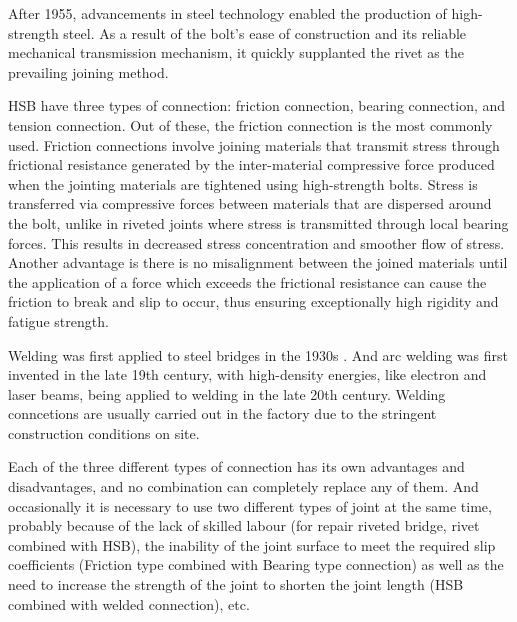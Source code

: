 After 1955, advancements in steel technology enabled the production of high-strength steel. As a result of the bolt's ease of construction and its reliable mechanical transmission mechanism, it quickly supplanted the rivet as the prevailing joining method.

\ac{HSB} have three types of connection: friction connection, bearing connection, and tension connection. Out of these, the friction connection is the most commonly used.
Friction connections involve joining materials that transmit stress through frictional resistance generated by the inter-material compressive force produced when the jointing materials are tightened using high-strength bolts. Stress is transferred via compressive forces between materials that are dispersed around the bolt, unlike in riveted joints where stress is transmitted through local bearing forces. This results in decreased stress concentration and smoother flow of stress. Another advantage is there is no misalignment between the joined materials until the application of a force which exceeds the frictional resistance can cause the friction to break and slip to occur, thus ensuring exceptionally high rigidity and fatigue strength.

Welding was first applied to steel bridges in the 1930s \cite{ALENCAR2019154}. And arc welding was first invented in the late 19th century, with high-density energies, like electron and laser beams, being applied to welding in the late 20th century. Welding conncetions are usually carried out in the factory due to the stringent construction conditions on site.


Each of the three different types of connection has its own advantages and disadvantages, and no combination can completely replace any of them. And occasionally it is necessary to use two different types of joint at the same time, probably because of the lack of skilled labour (for repair riveted bridge, rivet combined with HSB), the inability of the joint surface to meet the required slip coefficients (Friction type combined with Bearing type connection) as well as the need to increase the strength of the joint to shorten the joint length (HSB combined with welded connection), etc.



